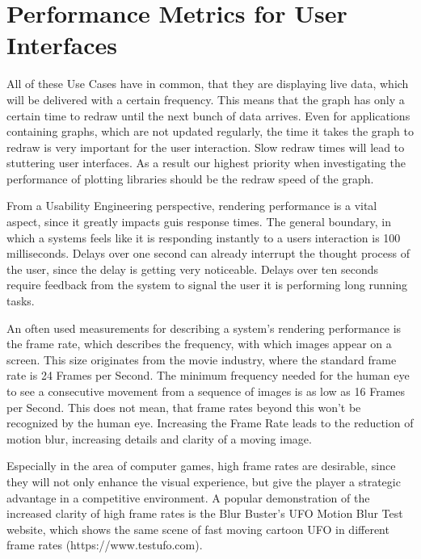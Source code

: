 \section{Performance Metrics for User Interfaces}
\label{sec:usecases:metrics}

All of these Use Cases have in common, that they are displaying live data, which
will be delivered with a certain frequency. This means that the graph has only a
certain time to redraw until the next bunch of data arrives. Even for
applications containing graphs, which are not updated regularly, the time it
takes the graph to redraw is very important for the user interaction. Slow
redraw times will lead to stuttering user interfaces. As a result our highest
priority when investigating the performance of plotting libraries should be the
redraw speed of the graph.

From a Usability Engineering perspective, rendering performance is a vital
aspect, since it greatly impacts \glspl{gui} response times. The general
boundary, in which a systems feels like it is responding instantly to a users
interaction is 100 milliseconds. Delays over one second can already interrupt
the thought process of the user, since the delay is getting very noticeable.
Delays over ten seconds require feedback from the system to
signal the user it is performing long running tasks.
\cite{UsabilityEngineering}

An often used measurements for describing a system's rendering performance is the
frame rate, which describes the frequency, with which images appear on a screen.
This size originates from the movie industry, where the standard frame rate is 24
Frames per Second. The minimum frequency needed for the human eye to see a
consecutive movement from a sequence of images is as low as 16 Frames per
Second. This does not mean, that frame rates beyond this won't be recognized by
the human eye. Increasing the Frame Rate leads to the reduction of motion blur,
increasing details and clarity of a moving image.

Especially in the area of computer games, high frame rates are desirable, since
they will not only enhance the visual experience, but give the player a
strategic advantage in a competitive environment.  A popular demonstration of
the increased clarity of high frame rates is the Blur Buster's UFO Motion Blur
Test website, which shows the same scene of fast moving cartoon UFO in different
frame rates (https://www.testufo.com).

